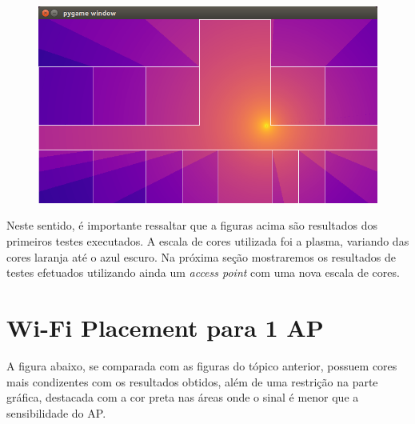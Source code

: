 \documentclass[
	12pt,				%
	openright,			%
	twoside,			%
	a4paper,			%
	english,			%
	french,				%
	spanish,			%
	brazil				%
	]{abntex2}
\begin{document}
\begin{figure}[htb]
\begin{minipage}{0.4\textwidth}
	\end{minipage}
	\hfill
	\begin{minipage}{0.4\textwidth}
		\centering \label{captura_4}
		\includegraphics[scale=0.3]{images/captura-4.jpg}
	\end{minipage}

\end{figure}

Neste sentido, é importante ressaltar que a figuras acima são resultados dos primeiros testes executados. A escala de cores utilizada foi a plasma, variando das cores laranja até o azul escuro. Na próxima seção mostraremos os resultados de testes efetuados utilizando ainda um \textit{access point} com uma nova escala de cores. 

\section[Wi-Fi Placement para 1 AP]{Wi-Fi Placement para 1 AP}

A figura abaixo, se comparada com as figuras do tópico anterior, possuem cores mais condizentes com os resultados obtidos, além de uma restrição na parte gráfica, destacada com a cor preta nas áreas onde o sinal é menor que a sensibilidade do AP.
\end{document}
